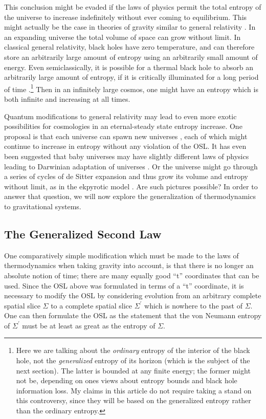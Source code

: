 \documentclass{article}
\begin{document}
This conclusion might be evaded if the laws of physics permit the total entropy of the universe to increase indefinitely without ever coming to equilibrium.  This might actually be the case in theories of gravity similar to general relativity \cite{carroll}.   In an expanding universe the total volume of space can grow without limit.  In classical general relativity, black holes have zero temperature, and can therefore store an arbitrarily large amount of entropy using an arbitrarily small amount of energy.  Even semiclassically, it is possible for a thermal black hole to absorb an arbitrarily large amount of entropy, if it is critically illuminated for a long period of time \cite{FPST}.\footnote{Here we are talking about the \emph{ordinary} entropy of the interior of the black hole, not the \emph{generalized} entropy of its horizon (which is the subject of the next section).  The latter is bounded at any finite energy; the former might not be, depending on ones views about entropy bounds and black hole information loss.  My claims in this article do not require taking a stand on this controversy, since they will be based on the generalized entropy rather than the ordinary entropy.}  Then in an infinitely large cosmos, one might have an entropy which is both infinite and increasing at all times.

Quantum modifications to general relativity may lead to even more exotic possibilities for cosmologies in an eternal-steady state entropy increase.  One proposal is that each universe can spawn new universes \cite{babies, FMM}, each of which might continue to increase in entropy without any violation of the OSL.  It has even been suggested that baby universes may have slightly different laws of physics leading to Darwinian adaptation of universes \cite{smolin}.  Or the universe might go through a series of cycles of de Sitter expansion and thus grow its volume and entropy without limit, as in the ekpyrotic model \cite{ek}.  Are such pictures possible?  In order to answer that question, we will now explore the generalization of thermodynamics to gravitational systems.

\subsection{The Generalized Second Law}\label{GSL}

One comparatively simple modification which must be made to the laws of thermodynamics when taking gravity into account, is that there is no longer an absolute notion of time; there are many equally good ``t'' coordinates that can be used.  Since the OSL above was formulated in terms of a ``t'' coordinate, it is necessary to modify the OSL by considering evolution from an arbitrary complete spatial slice $\Sigma$ to a complete spatial slice $\Sigma^\prime$ which is nowhere to the past of $\Sigma$.  One can then formulate the OSL as the statement that the von Neumann entropy of $\Sigma^\prime$ must be at least as great as the entropy of $\Sigma$.
\end{document}
